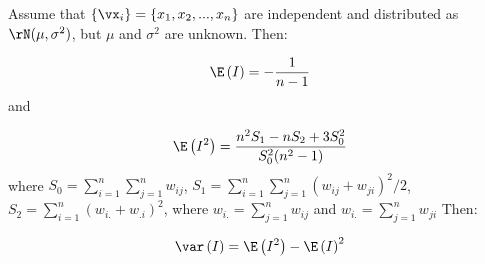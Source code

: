 \begin{theorem}\label{teo:Moran_normal}
Assume that $\left\lbrace \vx_i\right\rbrace = \left\lbrace x_1, x_2,..., x_n\right\rbrace$ are independent and distributed as $\rN(\mu, \sigma^2)$, but $\mu$ and $\sigma^2$ are unknown. Then:

\begin{equation}
\E\left(I\right) = - \frac{1}{n - 1} 
\end{equation}
%
and

\begin{equation}
\E\left(I^2\right) = \frac{n^2S_1 - nS_2 + 3S_0^2}{S_0^2(n^2 - 1)}
\end{equation}
%
where $S_0=\sum_{i = 1}^n\sum_{j=1}^nw_{ij}$, $S_1= \sum_{i = 1}^n\sum_{j = 1}^n(w_{ij} + w_{ji})^2/2$, $S_2 = \sum_{i = 1}^n(w_{i.} + w_{.i})^2$, where $w_{i.}= \sum_{j = 1}^nw_{ij}$ and $w_{i.}=\sum_{j = 1}^nw_{ji}$
Then:

\begin{equation}
\var\left(I\right)=\E\left(I^2\right) - \E\left(I\right)^2
\end{equation}
\end{theorem}

